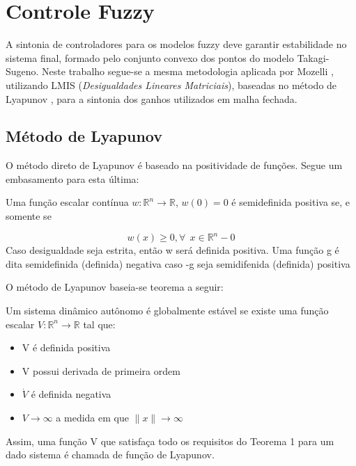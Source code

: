 %

\chapter{Controle Fuzzy} \label{capControle}
A sintonia de controladores para os modelos fuzzy deve garantir estabilidade no sistema final, formado pelo conjunto convexo dos pontos do modelo Takagi-Sugeno. Neste trabalho segue-se a mesma metodologia aplicada por Mozelli \cite{mozelli}, utilizando LMIS (\textit{Desigualdades Lineares Matriciais}), baseadas no método de Lyapunov \cite{lyapunov}, para a sintonia dos ganhos utilizados em malha fechada.

\section{Método de Lyapunov}
O método direto de Lyapunov é baseado na positividade de funções. Segue um embasamento para esta última:

\begin{mydef}
Uma função escalar contínua $w: \mathbb{R}^n \rightarrow \mathbb{R}$, $w(0) = 0$ é semidefinida positiva se, e somente se

	\begin{equation}
		w(x) \geq 0, \forall \ \ x \in \mathbb{R}^n - {0}
	\end{equation}
	Caso desigualdade seja estrita, então w será definida positiva. Uma função g é dita semidefinida (definida) negativa caso -g seja semidifenida (definida) positiva
\end{mydef}

O método de Lyapunov baseia-se teorema a seguir:

\begin{myteo} \label{teoLyapunov}
	Um sistema dinâmico autônomo é globalmente estável se existe uma função escalar $V : \mathbb{R}^n \rightarrow \mathbb{R} $ tal que:
	
	\begin{itemize}
		\item V é definida positiva
		\item V possui derivada de primeira ordem
		\item $\dot{V}$ é definida negativa
		\item $V \rightarrow \infty$ a medida em que $\|x\| \rightarrow \infty$
	\end{itemize}
\end{myteo}

Assim, uma função V que satisfaça todo os requisitos do Teorema 1 para um dado sistema é chamada de função de Lyapunov. 


